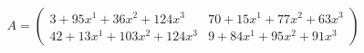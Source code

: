 \documentclass[preview]{standalone}
\begin{document}
\begin{align*}
A = \begin{pmatrix}3 + 95x^{1} + 36x^{2} + 124x^{3} & 70 + 15x^{1} + 77x^{2} + 63x^{3} \\ 42 + 13x^{1} + 103x^{2} + 124x^{3} & 9 + 84x^{1} + 95x^{2} + 91x^{3}\end{pmatrix}
\end{align*}
\end{document}
